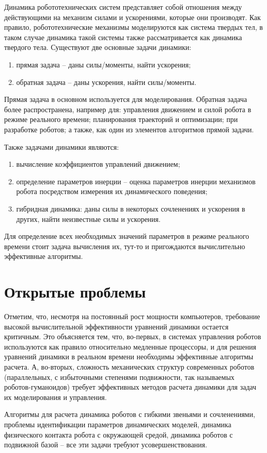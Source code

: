\documentclass[a4paper,14pt]{extreport}
\begin{document}
Динамика робототехнических систем представляет собой отношения между действующими на механизм силами и ускорениями, которые они  производят. Как правило, робототехнические механизмы моделируются как система твердых тел, в таком случае динамика такой системы также рассматривается как динамика твердого тела. 
Существуют две основные задачи динамики:
\begin{enumerate}
	\item прямая задача -- даны силы/моменты, найти ускорения;
	\item обратная задача -- даны ускорения, найти силы/моменты.
\end{enumerate}

Прямая задача в основном используется для моделирования. Обратная задача более распространена, например для: управления движением и силой робота в режиме реального времени; планирования траекторий и оптимизации; при разработке роботов; а также, как один из элементов алгоритмов прямой задачи.

Также задачами динамики являются:
\begin{enumerate}
	\item вычисление коэффициентов управлений движением;
	\item определение параметров инерции -- оценка параметров инерции механизмов робота посредством измерения их динамического поведения;
	\item гибридная динамика: даны силы в некоторых сочленениях и ускорения в других, найти неизвестные силы и ускорения.
\end{enumerate}

Для определение всех необходимых значений параметров в режиме реального времени стоит задача вычисления их, тут-то и пригождаются вычислительно эффективные алгоритмы.




\section{Открытые проблемы}
Отметим, что, несмотря на постоянный рост мощности компьютеров, требование высокой вычислительной эффективности уравнений динамики остается критичным. Это объясняется тем, что, во-первых, в системах управления роботов используются как правило относительно медленные процессоры, и для решения уравнений динамики в реальном времени необходимы эффективные алгоритмы расчета. А, во-вторых, сложность механических структур современных роботов (параллельных, с избыточными степенями подвижности, так называемых роботов-гуманоидов) требует эффективных методов расчета динамики для задач их моделирования и управления.

Алгоритмы для расчета динамика роботов с гибкими звеньями и сочленениями, проблемы идентификации параметров динамических моделей, динамика физического контакта робота с окружающей средой, динамика роботов с подвижной базой -- все эти задачи требуют усовершенствования.



\end{document}

